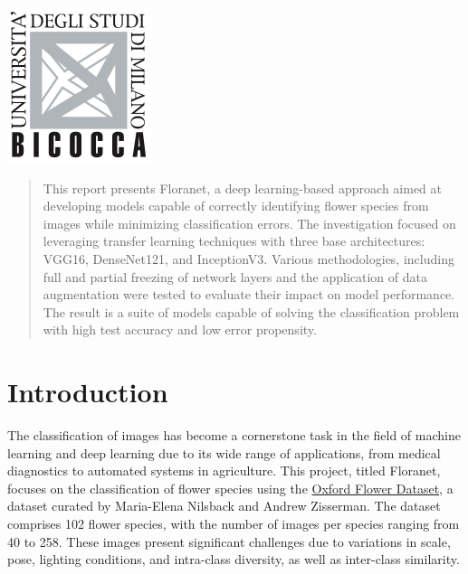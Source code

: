 \begin{titlepage}

\includegraphics{Images/logo}\\[1cm] %
 

\vfill %

\end{titlepage}


\begin{abstract}
This report presents Floranet, a deep learning-based approach aimed at developing models capable of correctly
identifying flower species from images while minimizing classification errors. The investigation focused on leveraging
transfer learning techniques with three base architectures: VGG16, DenseNet121, and InceptionV3. Various methodologies,
including full and partial freezing of network layers and the application of data augmentation were tested to evaluate
their impact on model performance. The result is a suite of models capable of solving the classification problem with
high test accuracy and low error propensity.

\end{abstract}

\section{Introduction}
The classification of images has become a cornerstone task in the field of machine learning and deep learning due to
its wide range of applications, from medical diagnostics to automated systems in agriculture. This project, titled
Floranet, focuses on the classification of flower species using the \href{https://www.robots.ox.ac.uk/~vgg/data/flowers/102/index.html}{Oxford Flower Dataset},
a dataset curated by Maria-Elena Nilsback and Andrew Zisserman. The dataset comprises 102 flower species, with the
number of images per species ranging from 40 to 258. These images present significant challenges due to variations in
scale, pose, lighting conditions, and intra-class diversity, as well as inter-class similarity.

